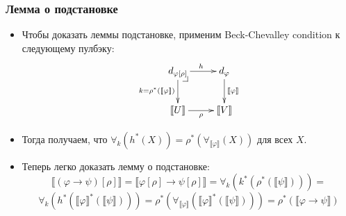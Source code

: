 \documentclass{beamer}
\makeatletter
\theoremstyle{definition}
\renewcommand{\ll}{\llbracket}
\newcommand{\rr}{\rrbracket}
\newcommand{\pb}[1][dr]{\save*!/#1-1.2pc/#1:(-1,1)@^{|-}\restore}
\makeatother
\begin{document}
\begin{frame}
\frametitle{Лемма о подстановке}
\begin{itemize}
\item Чтобы доказать леммы подстановке, применим Beck-Chevalley condition к следующему пулбэку:
\[ \xymatrix{ d_{\varphi[\rho]} \ar[r]^h \ar[d]_{k = \rho^*(\ll \varphi \rr)} \pb & d_\varphi \ar[d]^{\ll \varphi \rr} \\
              \ll U \rr \ar[r]_\rho                                               & \ll V \rr
            } \]
\item Тогда получаем, что $\forall_k(h^*(X)) = \rho^*(\forall_{\ll \varphi \rr}(X))$ для всех $X$.
\item Теперь легко доказать лемму о подстановке:
\[ \ll (\varphi \to \psi)[\rho] \rr = \ll \varphi[\rho] \to \psi[\rho] \rr = \forall_k(k^*(\rho^*(\ll \psi \rr))) = \]
\[ \forall_k(h^*(\ll \varphi \rr^*(\ll \psi \rr))) = \rho^*(\forall_{\ll \varphi \rr}(\ll \varphi \rr^*(\ll \psi \rr))) = \rho^*(\ll \varphi \to \psi \rr) \]
\end{itemize}
\end{frame}
\end{document}
